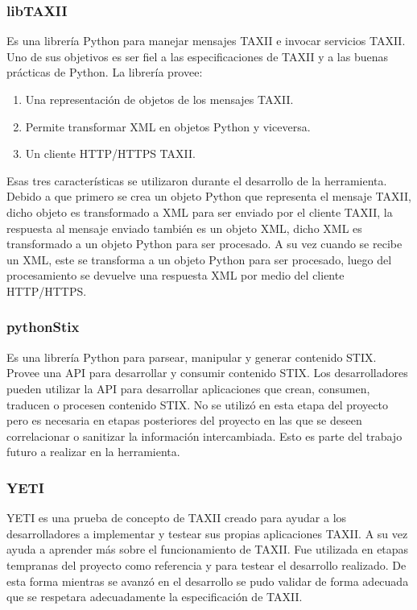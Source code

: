 \documentclass[11pt]{article}
\begin{document}
\subsubsection{libTAXII}
Es una librería Python para manejar mensajes TAXII e invocar servicios TAXII. Uno de sus objetivos es ser fiel a las especificaciones de TAXII y a las buenas prácticas de Python.
La librería provee:

\begin{enumerate}
	\item
	Una representación de objetos de los mensajes TAXII.
	\item
	Permite transformar XML en objetos Python y viceversa.
	\item
	Un cliente HTTP/HTTPS TAXII.
\end{enumerate}

Esas tres características se utilizaron durante el desarrollo de la herramienta. Debido a que primero se crea un objeto Python que representa el mensaje TAXII, dicho objeto es transformado a XML para ser enviado por el cliente TAXII, la respuesta al mensaje enviado también es un objeto XML, dicho XML es transformado a un objeto Python para ser procesado.
A su vez cuando se recibe un XML, este se transforma a un objeto Python para ser procesado, luego del procesamiento se devuelve una respuesta XML por medio del cliente HTTP/HTTPS.

\subsubsection{pythonStix}
Es una librería Python para parsear, manipular y generar contenido STIX. Provee una API para desarrollar y consumir contenido STIX. Los desarrolladores pueden utilizar la API para desarrollar aplicaciones que crean, consumen, traducen o procesen contenido STIX.
No se utilizó en esta etapa del proyecto pero es necesaria en etapas posteriores del proyecto en las que se deseen correlacionar o sanitizar la información intercambiada. Esto es parte del trabajo futuro a realizar en la herramienta. 

\subsubsection{YETI}
YETI es una prueba de concepto de TAXII creado para ayudar a los desarrolladores a implementar y testear sus propias aplicaciones TAXII. A su vez ayuda a aprender más sobre el funcionamiento de TAXII.
Fue utilizada en etapas tempranas del proyecto como referencia y para testear el desarrollo realizado. De esta forma mientras se avanzó en el desarrollo se pudo validar de forma adecuada que se respetara adecuadamente la especificación de TAXII.
\end{document}
